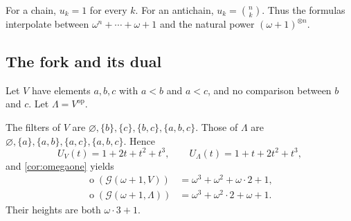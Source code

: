 \documentclass[11pt,a4paper]{article}
\theoremstyle{definition}
\theoremstyle{remark}
\newcommand{\Grid}{\mathcal{G}}
\newcommand{\otype}{\operatorname{o}}
\newcommand{\op}{\mathrm{op}}
\begin{document}
For a chain, $u_k=1$ for every $k$. For an antichain,
$u_k=\binom nk$. Thus the formulas interpolate between
$\omega^n+\cdots+\omega+1$ and the natural power
$(\omega+1)^{\otimes n}$.

\subsection{The fork and its dual}\label{sec:fork}
Let $V$ have elements $a,b,c$ with $a<b$ and $a<c$, and no comparison
between $b$ and $c$. Let $\Lambda=V^{\op}$.

\begin{center}
\end{center}

The filters of $V$ are
$\varnothing,\{b\},\{c\},\{b,c\},\{a,b,c\}$. Those of $\Lambda$ are
$\varnothing,\{a\},\{a,b\},\{a,c\},\{a,b,c\}$. Hence
\[
 U_V(t)=1+2t+t^2+t^3,
 \qquad U_\Lambda(t)=1+t+2t^2+t^3,
\]
and \cref{cor:omegaone} yields
\begin{align}
 \otype(\Grid(\omega+1,V))
 &=\omega^3+\omega^2+\omega\cdot2+1,\label{eq:forkV}\\
 \otype(\Grid(\omega+1,\Lambda))
 &=\omega^3+\omega^2\cdot2+\omega+1.\label{eq:forkL}
\end{align}
Their heights are both $\omega\cdot3+1$.
\end{document}
